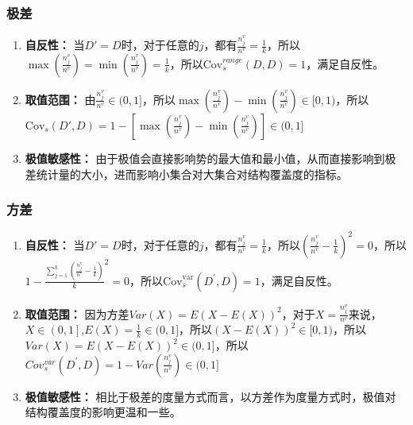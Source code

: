 \documentclass{../presentation}
\newcommand{\Cov}{\text{Cov}}
\begin{document}
    \begin{frame}
        \frametitle{极差}

        \begin{enumerate}
            \item \textbf{自反性：} 当$D' = D$时，对于任意的$j$，都有$\frac{n_j^v}{n^v}=\frac{1}{k}$，所以$\max{\left(\frac{n_j^v}{n^v}\right)}=\min(\frac{n_j^v}{n^v})=\frac{1}{k}$，所以$\Cov_s^{range}\left(D,D\right)=1$，满足自反性。
            \item \textbf{取值范围：} 由$\frac{n_j^v}{n^v}\in(0,1]$，所以$\max{\left(\frac{n_j^v}{n^v}\right)}-\min{\left(\frac{n_j^v}{n^v}\right)}\in[0,1)$，所以$\Cov_s(D',D)=1-\left[\max\left(\frac{n_j^v}{n^v}\right)-\min\left(\frac{n_j^v}{n^v}\right)\right]\in (0,1]$
            \item \textbf{极值敏感性：} 由于极值会直接影响势的最大值和最小值，从而直接影响到极差统计量的大小，进而影响小集合对大集合对结构覆盖度的指标。
        \end{enumerate}

    \end{frame}

    \begin{frame}
        \frametitle{方差}

        \begin{enumerate}
            \item \textbf{自反性：} 当$D' = D$时，对于任意的$j$，都有$\frac{n_j^v}{n^v}=\frac{1}{k}$，所以$\left(\frac{n_j^v}{n^v}-\frac{1}{k}\right)^2=0$，所以${1-\frac{\sum_{j=1}^{k}\left(\frac{n_j^v}{n^v}-\frac{1}{k}\right)}{k}}^2=0$，所以$\Cov_s^{\text{var}}\left(D^\prime,D\right)=1$，满足自反性。
            \item \textbf{取值范围：} 因为方差$Var\left(X\right)=E(X-E\left(X\right))^2$，对于$X=\frac{n_j^v}{n^v}$来说，$X\in\left(0,1\right]$,$E\left(X\right)=\frac{1}{k}\in(0,1]$，所以$\left(X-E\left(X\right)\right)^2\in[0,1)$，所以$Var\left(X\right)=E(X-E\left(X\right))^2\in(0,1]$，所以$Cov_s^{var}\left(D^\prime,D\right)=1-Var\left(\frac{n_j^v}{n^v}\right)\in(0,1]$
            \item \textbf{极值敏感性：} 相比于极差的度量方式而言，以方差作为度量方式时，极值对结构覆盖度的影响更温和一些。
        \end{enumerate}

    \end{frame}
\end{document}
